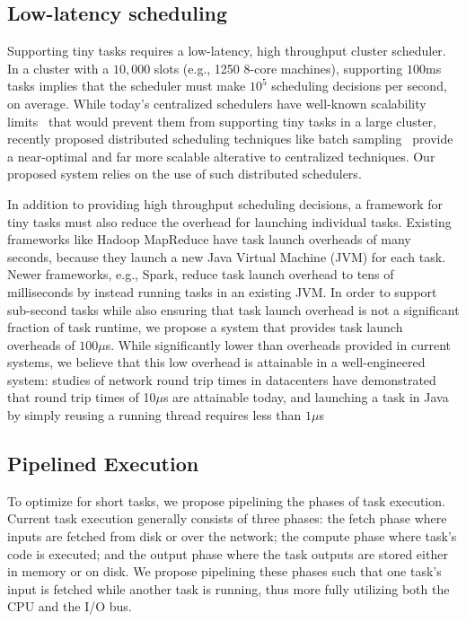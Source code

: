 \subsection{Low-latency scheduling}
Supporting tiny tasks requires a low-latency, high throughput cluster scheduler.
In a cluster with a $10,000$ slots (e.g., 1250 8-core machines),
supporting $100$ms tasks implies that the scheduler must make $10^5$ scheduling
decisions per second, on average.
While today's centralized schedulers have well-known scalability
limits~\cite{wilkesberkeley} that
would prevent them from supporting tiny tasks in a large cluster,
recently proposed distributed scheduling techniques like batch
sampling~\cite{ousterhoutbatch} provide a near-optimal and far more scalable
alterative to centralized techniques.
Our proposed system relies on the use of such distributed schedulers.

In addition to providing high throughput scheduling decisions, a framework for
tiny tasks must also reduce the overhead
for launching individual tasks. Existing frameworks like Hadoop MapReduce
have task launch overheads of many seconds, because they launch a new Java
Virtual Machine (JVM) for each task. Newer frameworks, e.g., Spark, reduce task
launch overhead to tens of milliseconds by instead running tasks in an
existing JVM.  In order to support sub-second tasks while also ensuring that
task launch overhead is not a significant fraction of task runtime, we propose a system
that provides task launch overheads of $100 \mu$s. While significantly
lower than overheads provided in current systems, we believe that this low
overhead is attainable in a well-engineered system:
studies of network round
trip times in datacenters have demonstrated that round trip times of 10$\mu$s
are attainable today, and launching a task in Java by simply
reusing a running thread requires less than $1\mu$s

\subsection{Pipelined Execution}
\label{sec:pipeline}
To optimize for short tasks, we propose pipelining the phases of task execution.
Current task execution generally consists of three phases: the fetch phase where
inputs are fetched from disk or over the network; the compute phase where task's
code is executed; and the output phase where the task outputs are stored either
in memory or on disk.  We propose pipelining these phases such that one task's
input is fetched while another task is running, thus more fully utilizing both
the CPU and the I/O bus.

